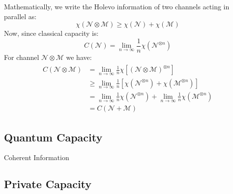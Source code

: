 Mathematically, we write the Holevo information of two channels acting in parallel as:
\begin{equation}
    \chi(\mathcal{N} \otimes \mathcal{M}) \geq \chi(\mathcal{N}) + \chi(\mathcal{M})
\end{equation}
Now, since classical capacity is:
\begin{equation}
    C(\mathcal{N}) = \lim_{n \rightarrow \infty }\frac{1}{n}\chi(\mathcal{N}^{\otimes n})
\end{equation}
For channel $\mathcal{N}\otimes\mathcal{M}$ we have:
\begin{align}\begin{split}
    C(\mathcal{N}\otimes\mathcal{M}) & = \lim_{n \rightarrow \infty }\frac{1}{n}\chi[(\mathcal{N}\otimes\mathcal{M})^{\otimes n}]\\
    & \geq \lim_{n \rightarrow \infty }\frac{1}{n}[\chi(\mathcal{N}^{\otimes n}) + \chi(\mathcal{M}^{\otimes n})]\\
    & = \lim_{n \rightarrow \infty }\frac{1}{n}\chi(\mathcal{N}^{\otimes n}) + \lim_{n \rightarrow \infty }\frac{1}{n}\chi(\mathcal{M}^{\otimes n})\\
    & = C(\mathcal{N} + \mathcal{M})
\end{split}\end{align}

\subsection{Quantum Capacity}
Coherent Information

\subsection{Private Capacity}
